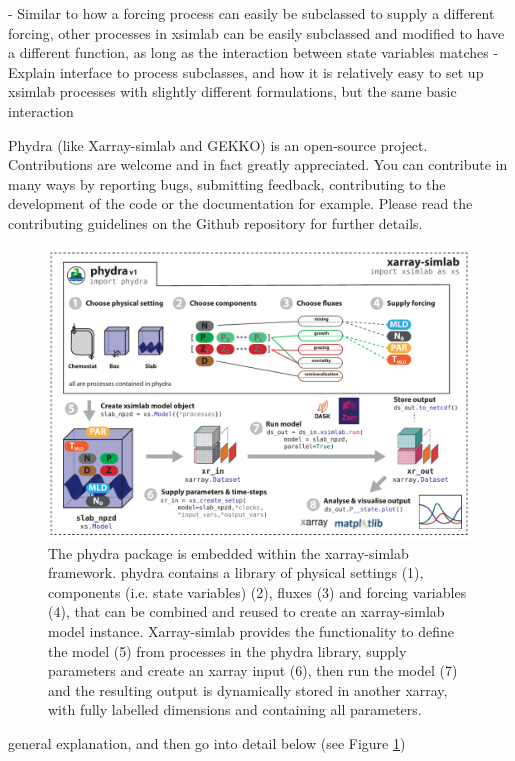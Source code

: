 \documentclass[template.tex]{subfiles}
\begin{document}
- Similar to how a forcing process can easily be subclassed to supply a different forcing, other processes in xsimlab can be easily subclassed and modified to have a different function, as long as the interaction between state variables matches
- Explain interface to process subclasses, and how it is relatively easy to set up xsimlab processes with slightly different  formulations, but the same basic interaction

Phydra (like Xarray-simlab and GEKKO) is an open-source project. Contributions are welcome and in fact greatly appreciated. You can contribute in many ways by reporting bugs, submitting feedback, contributing to the development of the code or the documentation for example. Please read the contributing guidelines on the Github repository for further details.





%
\begin{figure}[t]
\includegraphics[width=12cm]{Figures/firstdraft_schematics/01__schematics_phydra_1.pdf}
\caption{The phydra package is embedded within the xarray-simlab framework. phydra contains a library of physical settings (1), components (i.e. state variables) (2), fluxes (3) and forcing variables (4), that can be combined and reused to create an xarray-simlab model instance. Xarray-simlab provides the functionality to define the model (5) from processes in the phydra library, supply parameters and create an xarray input (6), then run the model (7) and the resulting output is dynamically stored in another xarray, with fully labelled dimensions and containing all parameters.}
\label{Figure:phydraschematics}
\end{figure}

general explanation, and then go into detail below (see Figure \ref{Figure:phydraschematics})





\biblio
\end{document}

